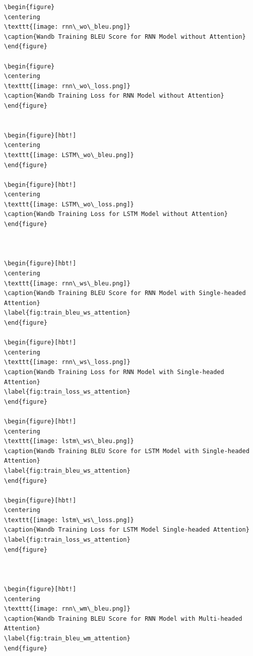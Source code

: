 \documentclass[11pt]{article}
\begin{document}
\begin{verbatim}
\begin{figure}
\centering
\texttt{[image: rnn\_wo\_bleu.png]}
\caption{Wandb Training BLEU Score for RNN Model without Attention}
\end{figure}

\begin{figure}
\centering
\texttt{[image: rnn\_wo\_loss.png]}
\caption{Wandb Training Loss for RNN Model without Attention}
\end{figure}


\begin{figure}[hbt!]
\centering
\texttt{[image: LSTM\_wo\_bleu.png]}
\end{figure}

\begin{figure}[hbt!]
\centering
\texttt{[image: LSTM\_wo\_loss.png]}
\caption{Wandb Training Loss for LSTM Model without Attention}
\end{figure}



\begin{figure}[hbt!]
\centering
\texttt{[image: rnn\_ws\_bleu.png]}
\caption{Wandb Training BLEU Score for RNN Model with Single-headed Attention}
\label{fig:train_bleu_ws_attention}
\end{figure}

\begin{figure}[hbt!]
\centering
\texttt{[image: rnn\_ws\_loss.png]}
\caption{Wandb Training Loss for RNN Model with Single-headed Attention}
\label{fig:train_loss_ws_attention}
\end{figure}

\begin{figure}[hbt!]
\centering
\texttt{[image: lstm\_ws\_bleu.png]}
\caption{Wandb Training BLEU Score for LSTM Model with Single-headed Attention}
\label{fig:train_bleu_ws_attention}
\end{figure}

\begin{figure}[hbt!]
\centering
\texttt{[image: lstm\_ws\_loss.png]}
\caption{Wandb Training Loss for LSTM Model Single-headed Attention}
\label{fig:train_loss_ws_attention}
\end{figure}



\begin{figure}[hbt!]
\centering
\texttt{[image: rnn\_wm\_bleu.png]}
\caption{Wandb Training BLEU Score for RNN Model with Multi-headed Attention}
\label{fig:train_bleu_wm_attention}
\end{figure}


\end{verbatim}
\end{document}

